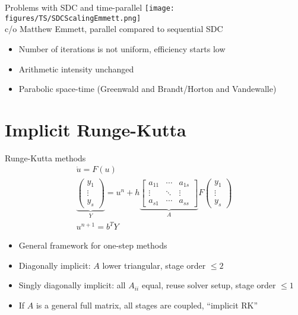 \documentclass{beamer}
\begin{document}
\begin{frame}{Problems with SDC and time-parallel}
  \texttt{[image: figures/TS/SDCScalingEmmett.png]} \\
  c/o Matthew Emmett, parallel compared to sequential SDC
  \begin{itemize}
  \item Number of iterations is not uniform, efficiency starts low
  \item Arithmetic intensity unchanged
  \item Parabolic space-time (Greenwald and Brandt/Horton and Vandewalle)
  \end{itemize}
\end{frame}

\section{Implicit Runge-Kutta}
\begin{frame}{Runge-Kutta methods}
  \begin{gather*}
    \dot u = F(u) \\
    \underbrace{
    \begin{pmatrix}
      y_1 \\
      \vdots \\
      y_s
    \end{pmatrix}}_Y =
    u^{n} + h
    \underbrace{
    \begin{bmatrix}
      a_{11} & \dotsb & a_{1s} \\
      \vdots & \ddots & \vdots \\
      a_{s1} & \dotsb & a_{ss}
    \end{bmatrix}}_A
    F
    \begin{pmatrix}
      y_1 \\
      \vdots \\
      y_s
    \end{pmatrix} \\
    u^{n+1} = b^T Y
  \end{gather*}
  \begin{itemize}
  \item General framework for one-step methods
  \item Diagonally implicit: $A$ lower triangular, stage order $\le 2$
  \item Singly diagonally implicit: all $A_{ii}$ equal, reuse solver setup, stage order $\le 1$
  \item If $A$ is a general full matrix, all stages are coupled, ``implicit RK''
  \end{itemize}
\end{frame}
\end{document}
